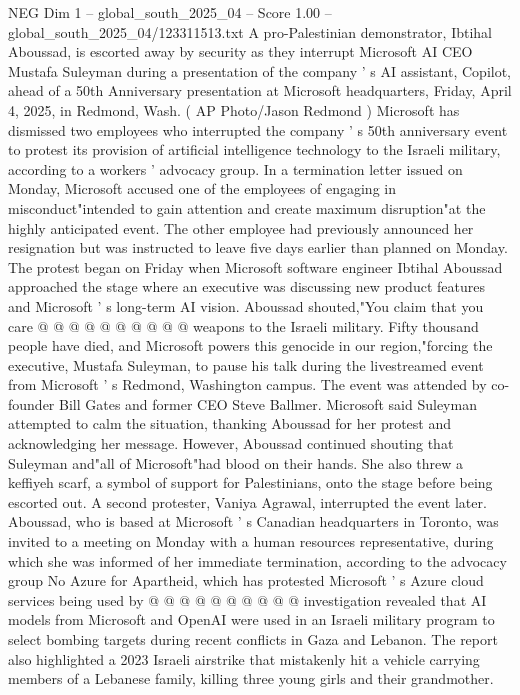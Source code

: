 \begin{textsample}{NEG Dim 1 – global\_south\_2025\_04 – Score 1.00 – global\_south\_2025\_04/123311513.txt}  \label{ex:f1_neg_167}
A pro-Palestinian demonstrator, Ibtihal Aboussad, is escorted away by security as they interrupt Microsoft AI CEO Mustafa Suleyman during a presentation of the company ' s AI assistant, Copilot, ahead of a 50th Anniversary presentation at Microsoft headquarters, Friday, April 4, 2025, in Redmond, Wash. ( AP Photo/Jason Redmond ) Microsoft has dismissed two employees who interrupted the company ' s 50th anniversary event to protest its provision of artificial intelligence technology to the Israeli military, according to a workers ' advocacy group.
In a termination letter issued on Monday, Microsoft accused one of the employees of engaging in misconduct"intended to gain attention and create maximum disruption"at the highly anticipated event.
The other employee had previously announced her resignation but was instructed to leave five days earlier than planned on Monday.
The protest began on Friday when Microsoft software engineer Ibtihal Aboussad approached the stage where an executive was discussing new product features and Microsoft ' s long-term AI vision.
Aboussad shouted,"You claim that you care @ @ @ @ @ @ @ @ @ @ weapons to the Israeli military.
Fifty thousand people have died, and Microsoft powers this genocide in our region,"forcing the executive, Mustafa Suleyman, to pause his talk during the livestreamed event from Microsoft ' s Redmond, Washington campus.
The event was attended by co-founder Bill Gates and former CEO Steve Ballmer.
Microsoft said Suleyman attempted to calm the situation, thanking Aboussad for her protest and acknowledging her message.
However, Aboussad continued shouting that Suleyman and"all of Microsoft"had blood on their hands.
She also threw a keffiyeh scarf, a symbol of support for Palestinians, onto the stage before being escorted out.
A second protester, Vaniya Agrawal, interrupted the event later.
Aboussad, who is based at Microsoft ' s Canadian headquarters in Toronto, was invited to a meeting on Monday with a human resources representative, during which she was informed of her immediate termination, according to the advocacy group No Azure for Apartheid, which has protested Microsoft ' s Azure cloud services being used by @ @ @ @ @ @ @ @ @ @ investigation revealed that AI models from Microsoft and OpenAI were used in an Israeli military program to select bombing targets during recent conflicts in Gaza and Lebanon.
The report also highlighted a 2023 Israeli airstrike that mistakenly hit a vehicle carrying members of a Lebanese family, killing three young girls and their grandmother.

\end{textsample}
